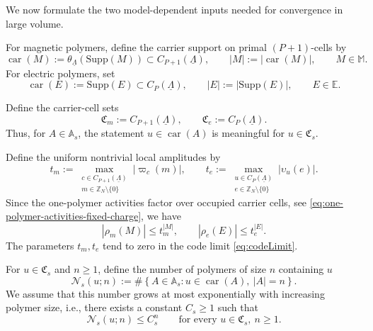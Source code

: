 \documentclass[dvipsnames,a4paper]{article}
\numberwithin{equation}{section}
\theoremstyle{definition}
\theoremstyle{remark}
\newcommand{\Supp}{\mathrm{Supp}}
\begin{document}
We now formulate the two model-dependent inputs needed for convergence in large volume.

For magnetic polymers, define the carrier support on primal \((P+1)\)-cells by
\begin{equation}
	\operatorname{car}(M)
	:=
	\theta_{\underline\Lambda}(\Supp(M))
	\subset C_{P+1}(\underline\Lambda),
	\qquad
	|M|:=|\operatorname{car}(M)|,
	\qquad
	M\in \mathbb M .
	\label{eq:magnetic-carrier-size}
\end{equation}
For electric polymers, set
\begin{equation}
	\operatorname{car}(E):=\Supp(E)\subset C_P(\underline\Lambda),
	\qquad
	|E|:=|\Supp(E)|,
	\qquad
	E\in \mathbb E .
	\label{eq:electric-carrier-size}
\end{equation}

Define the carrier-cell sets
\begin{equation}
	\mathfrak C_m:=C_{P+1}(\underline\Lambda),
	\qquad
	\mathfrak C_e:=C_P(\underline\Lambda).
	\label{eq:carrier-cell-sets}
\end{equation}
Thus, for \(A\in\mathbb A_s\), the statement \(u\in\operatorname{car}(A)\) is meaningful
for \(u\in\mathfrak C_s\).

Define the uniform nontrivial local amplitudes by
\begin{equation}
	t_m
	:=
	\max_{\substack{c\in C_{P+1}(\underline\Lambda)\\ m\in \mathbb Z_N\setminus\{0\}}}
	|\varpi_c(m)|,
	\qquad
	t_e
	:=
	\max_{\substack{u\in C_P(\underline\Lambda)\\ e\in \mathbb Z_N\setminus\{0\}}}
	|\upsilon_u(e)|.
	\label{eq:tm-te}
\end{equation}
Since the one-polymer activities
factor over occupied carrier cells, see \eqref{eq:one-polymer-activities-fixed-charge},
we have
\begin{equation}
	|\rho_m(M)|\le t_m^{|M|},
	\qquad
	|\rho_e(E)|\le t_e^{|E|}.
	\label{eq:activity-hypothesis}
\end{equation}
The parameters \(t_m,t_e\) tend to zero in the code limit
\eqref{eq:codeLimit}.

For \(u\in\mathfrak C_s\) and \(n\ge 1\), define the number of polymers of size $n$ containing $u$
\begin{equation}
	\mathcal N_s(u;n)
	:=
	\#\left\{
	A\in\mathbb A_s:
	u\in\operatorname{car}(A),\ |A|=n
	\right\}.
	\label{eq:Ns-def}
\end{equation}
We assume that this number grows at most exponentially with increasing polymer size, i.e., there exists a constant \(C_s\ge 1\) such that
\begin{equation}
	\mathcal N_s(u;n)\le C_s^n
	\qquad
	\text{for every }u\in\mathfrak C_s,\ n\ge 1.
	\label{eq:counting-hypothesis}
\end{equation}
\end{document}
